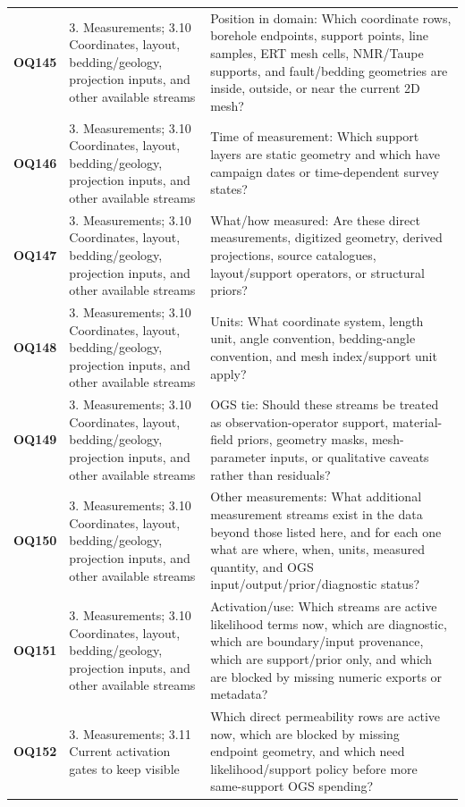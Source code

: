 \begin{longtable}{@{}L{0.10\textwidth} L{0.23\textwidth} L{0.59\textwidth}@{}}
\addlinespace[0.16em]
\textbf{OQ145} & 3. Measurements; 3.10 Coordinates, layout, bedding/geology, projection inputs, and other available streams & Position in domain: Which coordinate rows, borehole endpoints, support points, line samples, ERT mesh cells, NMR/Taupe supports, and fault/bedding geometries are inside, outside, or near the current 2D mesh?\\
\addlinespace[0.16em]
\textbf{OQ146} & 3. Measurements; 3.10 Coordinates, layout, bedding/geology, projection inputs, and other available streams & Time of measurement: Which support layers are static geometry and which have campaign dates or time-dependent survey states?\\
\addlinespace[0.16em]
\textbf{OQ147} & 3. Measurements; 3.10 Coordinates, layout, bedding/geology, projection inputs, and other available streams & What/how measured: Are these direct measurements, digitized geometry, derived projections, source catalogues, layout/support operators, or structural priors?\\
\addlinespace[0.16em]
\textbf{OQ148} & 3. Measurements; 3.10 Coordinates, layout, bedding/geology, projection inputs, and other available streams & Units: What coordinate system, length unit, angle convention, bedding-angle convention, and mesh index/support unit apply?\\
\addlinespace[0.16em]
\textbf{OQ149} & 3. Measurements; 3.10 Coordinates, layout, bedding/geology, projection inputs, and other available streams & OGS tie: Should these streams be treated as observation-operator support, material-field priors, geometry masks, mesh-parameter inputs, or qualitative caveats rather than residuals?\\
\addlinespace[0.16em]
\textbf{OQ150} & 3. Measurements; 3.10 Coordinates, layout, bedding/geology, projection inputs, and other available streams & Other measurements: What additional measurement streams exist in the data beyond those listed here, and for each one what are where, when, units, measured quantity, and OGS input/output/prior/diagnostic status?\\
\addlinespace[0.16em]
\textbf{OQ151} & 3. Measurements; 3.10 Coordinates, layout, bedding/geology, projection inputs, and other available streams & Activation/use: Which streams are active likelihood terms now, which are diagnostic, which are boundary/input provenance, which are support/prior only, and which are blocked by missing numeric exports or metadata?\\
\addlinespace[0.16em]
\textbf{OQ152} & 3. Measurements; 3.11 Current activation gates to keep visible & Which direct permeability rows are active now, which are blocked by missing endpoint geometry, and which need likelihood/support policy before more same-support OGS spending?\\

\end{longtable}
